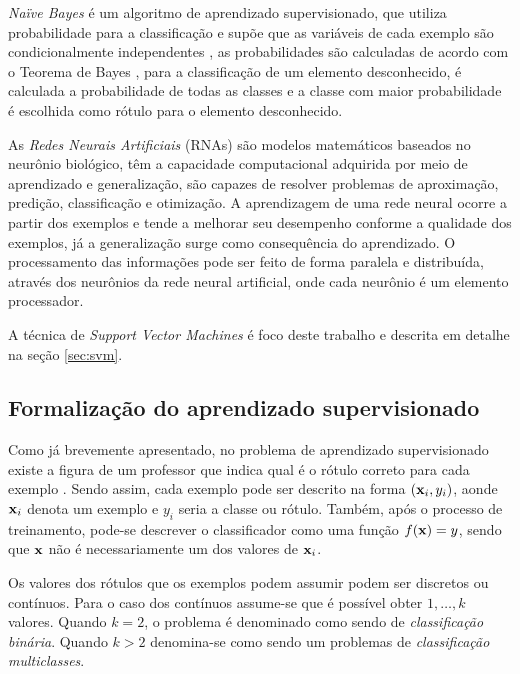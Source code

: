 \emph{Naïve Bayes} é um algoritmo de aprendizado supervisionado, que
utiliza probabilidade para a classificação e supõe que as variáveis de cada
exemplo são condicionalmente independentes \cite{de-categorizacao}, as
probabilidades são calculadas de acordo com o Teorema de Bayes
\cite{kim2003poisson}, para a classificação de um elemento desconhecido, é
calculada a probabilidade de todas as classes e a classe com maior
probabilidade é escolhida como rótulo para o elemento desconhecido.
~\cite{pardo2002aprendizado}

As \emph{Redes Neurais Artificiais} (RNAs) são modelos matemáticos baseados no neurônio biológico, têm a capacidade computacional adquirida por meio de aprendizado e generalização, são capazes de resolver problemas de aproximação, predição, classificação e otimização. A aprendizagem de uma rede neural ocorre a partir dos exemplos e tende a melhorar seu desempenho conforme a qualidade dos exemplos, já a generalização surge como consequência do aprendizado. O processamento das informações pode ser feito de forma paralela e distribuída, através dos neurônios da rede neural artificial, onde cada neurônio é um elemento processador.~\cite{rezende2003sistemas}

A técnica de \emph{Support Vector Machines} é foco deste trabalho e descrita em detalhe na se\c{c}ão \ref{sec:svm}.

\subsection{Formalização do aprendizado supervisionado}

Como já brevemente apresentado, no problema de aprendizado supervisionado existe a figura de um professor que indica qual é o rótulo correto para cada exemplo . Sendo assim, cada exemplo pode ser descrito na forma $(\mathbf{x}_i, y_i)$, aonde $\mathbf{x}_i$ denota um exemplo e $y_i$ seria a classe ou rótulo. Também, após o processo de treinamento, pode-se descrever o classificador como uma função $f(\mathbf{x}) = y$, sendo que $\mathbf{x}$ não é necessariamente um dos valores de $\mathbf{x}_i$.

Os valores dos rótulos que os exemplos podem assumir podem ser discretos ou contínuos. Para o caso dos contínuos assume-se que é possível obter $1,\dotsc,k$ valores. Quando $k = 2$, o problema é denominado como sendo de \emph{classificação binária}. Quando $k > 2$ denomina-se como sendo um problemas de \emph{classificação multiclasses}.

